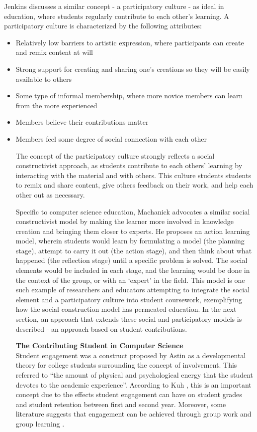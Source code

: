 Jenkins \cite{jenkins2009confronting} discusses a similar concept - a participatory culture - as ideal in education, where students regularly contribute to each other's learning. A participatory culture is characterized by the following attributes:

\begin{itemize}
\item Relatively low barriers to artistic expression, where participants can create and remix content at will
\item Strong support for creating and sharing one’s creations so they will be easily available to others
\item Some type of informal membership, where more novice members can learn from the more experienced
\item Members believe their contributions matter
\item Members feel some degree of social connection with each other

The concept of the participatory culture strongly reflects a social constructivist approach, as students contribute to each others' learning by interacting with the material and with others. This culture students students to remix and share content, give others feedback on their work, and help each other out as necessary.

Specific to computer science education, Machanick \cite{machanick2007social} advocates a similar social constructivist model by making the learner more involved in knowledge creation and bringing them closer to experts. He proposes an action learning model, wherein students would learn by formulating a model (the planning stage), attempt to carry it out (the action stage), and then think about what happened (the reflection stage) until a specific problem is solved. The social elements would be included in each stage, and the learning would be done in the context of the group, or with an ‘expert’ in the field. This model is one such example of researchers and educators attempting to integrate the social element and a participatory culture into student coursework, exemplifying how the social construction model has permeated education. In the next section, an approach that extends these social and participatory models is described - an approach based on student contributions.

\textbf{The Contributing Student in Computer Science} \\
Student engagement was a construct proposed by Astin \cite{astin1984student} as a developmental theory for college students surrounding the concept of involvement. This referred to ``the amount of physical and psychological energy that the student devotes to the academic experience''. According to Kuh \cite{kuh2001assessing}, this is an important concept due to the effects student engagement can have on student grades and student retention between first and second year. Moreover, some literature suggests that engagement can be achieved through group work and group learning \cite{bower2007groupwork}.


\end{itemize}
